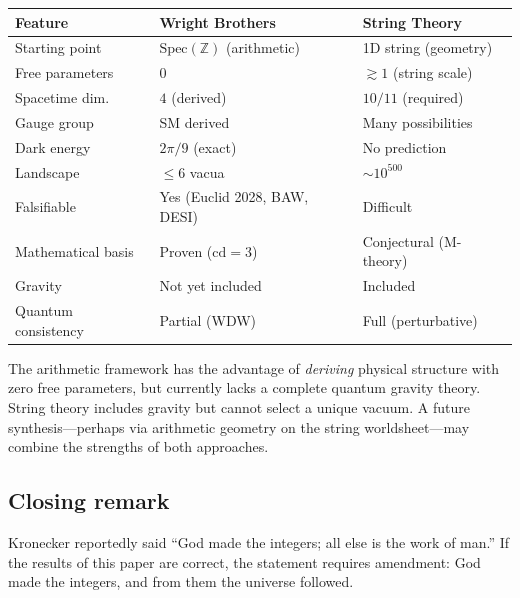 \documentclass[12pt,a4paper]{article}
\theoremstyle{definition}
\newcommand{\Spec}{\mathrm{Spec}}
\newcommand{\cd}{\mathrm{cd}}
\newcommand{\Z}{\mathbb{Z}}
\begin{document}
\begin{center}
\begin{tabular}{p{3.5cm}p{4.5cm}p{4.5cm}}
\toprule
\textbf{Feature} & \textbf{Wright Brothers} & \textbf{String Theory} \\
\midrule
Starting point      & $\Spec(\Z)$ (arithmetic)        & 1D string (geometry) \\
Free parameters     & $0$                              & $\gtrsim 1$ (string scale) \\
Spacetime dim.      & $4$ (derived)                    & $10/11$ (required) \\
Gauge group         & SM derived                       & Many possibilities \\
Dark energy         & $2\pi/9$ (exact)                 & No prediction \\
Landscape           & $\le 6$ vacua                    & $\sim 10^{500}$ \\
Falsifiable         & Yes (Euclid 2028, BAW, DESI)     & Difficult \\
Mathematical basis  & Proven ($\cd=3$)                 & Conjectural (M-theory) \\
Gravity             & Not yet included                  & Included \\
Quantum consistency & Partial (WDW)                     & Full (perturbative) \\
\bottomrule
\end{tabular}
\end{center}

The arithmetic framework has the advantage of \emph{deriving} physical structure
with zero free parameters, but currently lacks a complete quantum gravity theory.
String theory includes gravity but cannot select a unique vacuum.  A future
synthesis---perhaps via arithmetic geometry on the string worldsheet---may
combine the strengths of both approaches.

\subsection{Closing remark}

Kronecker reportedly said ``God made the integers; all else is the work of man.''
If the results of this paper are correct, the statement requires amendment:
God made the integers, and from them the universe followed.
\end{document}
